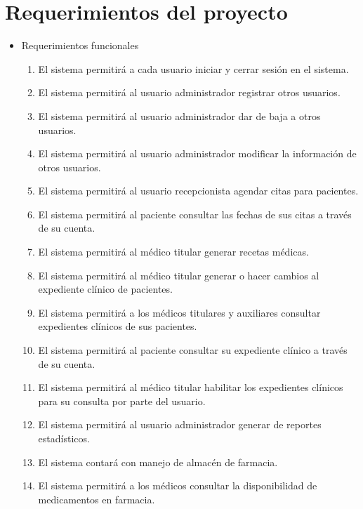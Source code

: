 \documentclass[12pt,letterpaper]{article}
\begin{document}
    \section{Requerimientos del proyecto}
        \justify
                \begin{itemize}
                    \item Requerimientos funcionales
                    \begin{enumerate}
                        \item El sistema permitirá a cada usuario iniciar y cerrar sesión en el sistema.
                        \item El sistema permitirá al usuario administrador registrar otros usuarios.
                        \item El sistema permitirá al usuario administrador dar de baja a otros usuarios.
                        \item El sistema permitirá al usuario administrador modificar la información de otros usuarios.
                        \item El sistema permitirá al usuario recepcionista agendar citas para pacientes.
                        \item El sistema permitirá al paciente consultar las fechas de sus citas a través de su cuenta.
                        \item El sistema permitirá al médico titular generar recetas médicas.
                        \item El sistema permitirá al médico titular generar o hacer cambios al expediente clínico de pacientes.
                        \item El sistema permitirá a los médicos titulares y auxiliares consultar expedientes clínicos de sus pacientes.
                        \item El sistema permitirá al paciente consultar su expediente clínico a través de su cuenta.
                        \item El sistema permitirá al médico titular habilitar los expedientes clínicos para su consulta por parte del usuario.
                        \item El sistema permitirá al usuario administrador generar de reportes estadísticos.
                        \item El sistema contará con manejo de almacén de farmacia.
                        \item El sistema permitirá a los médicos consultar la disponibilidad de medicamentos en farmacia.

\end{enumerate}
\end{itemize}
\end{document}
